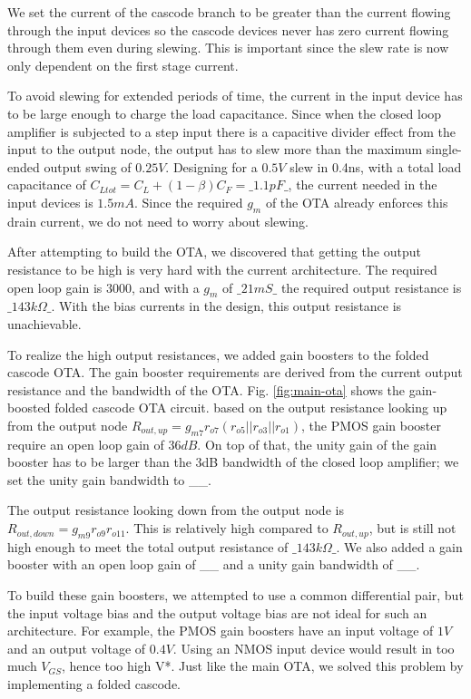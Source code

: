 \documentclass[conference]{IEEEtran}
\begin{document}
We set the current of the cascode branch to be greater than the current flowing through the input devices so the cascode devices never has zero current flowing through them even during slewing. This is important since the slew rate is now only dependent on the first stage current.

To avoid slewing for extended periods of time, the current in the input device has to be large enough to charge the load capacitance. Since when the closed loop amplifier is subjected to a step input there is a capacitive divider effect from the input to the output node, the output has to slew more than the maximum single-ended output swing of $0.25V$. Designing for a $0.5V$ slew in 0.4ns, with a total load capacitance of $C_{Ltot} = C_L + (1-\beta)C_F = \_1.1pF\_$, the current needed in the input devices is $1.5mA$. Since the required $g_m$ of the OTA already enforces this drain current, we do not need to worry about slewing.

After attempting to build the OTA, we discovered that getting the output resistance to be high is very hard with the current architecture. The required open loop gain is $3000$, and with a $g_m$ of $\_21mS\_$ the required output resistance is $\_143k\Omega\_$. With the bias currents in the design, this output resistance is unachievable.

To realize the high output resistances, we added gain boosters to the folded cascode OTA. The gain booster requirements are derived from the current output resistance and the bandwidth of the OTA. Fig. \ref{fig:main-ota} shows the gain-boosted folded cascode OTA circuit. based on the output resistance looking up from the output node $R_{out, up} = g_{m7}r_{o7}(r_{o5}||r_{o3}||r_{o1})$, the PMOS gain booster require an open loop gain of $36dB$. On top of that, the unity gain of the gain booster has to be larger than the 3dB bandwidth of the closed loop amplifier; we set the unity gain bandwidth to \_\_.

The output resistance looking down from the output node is $R_{out, down} = g_{m9}r_{o9}r_{o11}$. This is relatively high compared to $R_{out, up}$, but is still not high enough to meet the total output resistance of $\_143k\Omega\_$. We also added a gain booster with an open loop gain of \_\_ and a unity gain bandwidth of \_\_.

To build these gain boosters, we attempted to use a common differential pair, but the input voltage bias and the output voltage bias are not ideal for such an architecture. For example, the PMOS gain boosters have an input voltage of $1V$ and an output voltage of $0.4V$. Using an NMOS input device would result in too much $V_{GS}$, hence too high V*. Just like the main OTA, we solved this problem by implementing a folded cascode.
\end{document}
